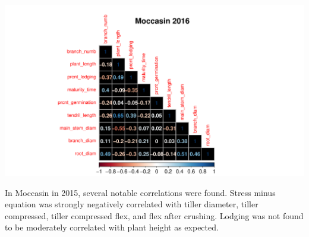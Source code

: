 \documentclass[11pt]{article}\usepackage[]{graphicx}\usepackage[]{color}
\makeatletter
\def\maxwidth{ %
  \ifdim\Gin@nat@width>\linewidth
    \linewidth
  \else
    \Gin@nat@width
  \fi
}
\newenvironment{knitrout}{}{} %
\makeatother
\begin{document}
\begin{knitrout}\footnotesize
{}\color{fgcolor}

{\centering \includegraphics[width=\maxwidth]{figure/moc-1} 

}



\end{knitrout}
\pagebreak
In Moccasin in 2015, several notable correlations were found. Stress minus equation was strongly negatively correlated with tiller diameter, tiller compressed, tiller compressed flex, and flex after crushing. Lodging was not found to be moderately correlated with plant height as expected. 
\end{document}
